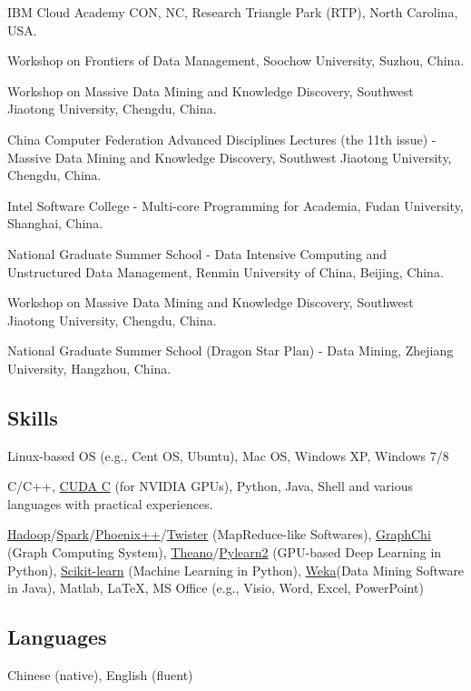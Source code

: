 \documentclass[]{article}
\renewenvironment{description}{
  \begin{basedescript}{\desclabelstyle{\pushlabel}\desclabelwidth{10em}}
}{
  \end{basedescript}
}
\begin{document}
\begin{description}
\item[04/2012]
IBM Cloud Academy CON, NC, Research Triangle Park (RTP), North Carolina,
USA.
\item[12/2010]
Workshop on Frontiers of Data Management, Soochow University, Suzhou,
China.
\item[11/2010]
Workshop on Massive Data Mining and Knowledge Discovery, Southwest
Jiaotong University, Chengdu, China.
\item[11/2010]
China Computer Federation Advanced Disciplines Lectures (the 11th issue)
- Massive Data Mining and Knowledge Discovery, Southwest Jiaotong
University, Chengdu, China.
\item[08/2010]
Intel Software College - Multi-core Programming for Academia, Fudan
University, Shanghai, China.
\item[07/2010]
National Graduate Summer School - Data Intensive Computing and
Unstructured Data Management, Renmin University of China, Beijing,
China.
\item[12/2009]
Workshop on Massive Data Mining and Knowledge Discovery, Southwest
Jiaotong University, Chengdu, China.
\item[08/2009]
National Graduate Summer School (Dragon Star Plan) - Data Mining,
Zhejiang University, Hangzhou, China.
\end{description}

\subsection{Skills}\label{skills}

\begin{description}
\item[Operating System]
Linux-based OS (e.g., Cent OS, Ubuntu), Mac OS, Windows XP, Windows 7/8
\item[Programming]
C/C++, \href{http://www.nvidia.com/object/cuda_home_new.html}{CUDA C}
(for NVIDIA GPUs), Python, Java, Shell and various languages with
practical experiences.
\item[Others]
\href{http://hadoop.apache.org/}{Hadoop}/\href{http://spark.apache.org/}{Spark}/\href{http://mapreduce.stanford.edu/}{Phoenix++}/\href{http://www.iterativemapreduce.org/}{Twister}
(MapReduce-like Softwares), \href{https://github.com/GraphChi}{GraphChi}
(Graph Computing System),
\href{http://deeplearning.net/software/theano/}{Theano}/\href{http://deeplearning.net/software/pylearn2/}{Pylearn2}
(GPU-based Deep Learning in Python),
\href{http://scikit-learn.org/stable/}{Scikit-learn} (Machine Learning
in Python), \href{http://www.cs.waikato.ac.nz/ml/weka/}{Weka}(Data
Mining Software in Java), Matlab, \LaTeX, MS Office (e.g., Visio, Word,
Excel, PowerPoint)
\end{description}

\subsection{Languages}\label{languages}

Chinese (native), English (fluent)
\end{document}
